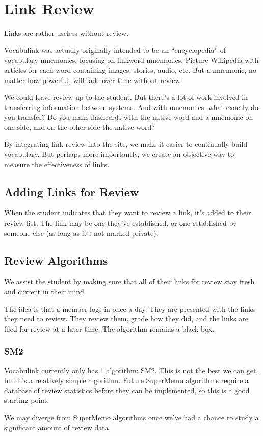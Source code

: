 \chapter{Link Review}

Links are rather useless without review.

Vocabulink was actually originally intended to be an ``encyclopedia'' of
vocabulary mnemonics, focusing on linkword mnemonics. Picture Wikipedia with
articles for each word containing images, stories, audio, etc. But a mnemonic,
no matter how powerful, will fade over time without review.

We could leave review up to the student. But there's a lot of work involved in
transferring information between systems. And with mnemonics, what exactly do
you transfer? Do you make flashcards with the native word and a mnemonic on one
side, and on the other side the native word?

By integrating link review into the site, we make it easier to continually
build vocabulary. But perhaps more importantly, we create an objective way to
measure the effectiveness of links.

\section{Adding Links for Review}

When the student indicates that they want to review a link, it's added to their
review list. The link may be one they've established, or one established by
someone else (as long as it's not marked private).

\section{Review Algorithms}

We assist the student by making sure that all of their links for review stay
fresh and current in their mind.

The idea is that a member logs in once a day. They are presented with the links
they need to review. They review them, grade how they did, and the links are
filed for review at a later time. The algorithm remains a black box.

\subsection{SM2}

Vocabulink currently only has 1 algorithm:
\href{http://www.supermemo.com/english/ol/sm2.htm}{SM2}. This is not the best
we can get, but it's a relatively simple algorithm. Future SuperMemo algorithms
require a database of review statistics before they can be implemented, so this
is a good starting point.

We may diverge from SuperMemo algorithms once we've had a chance to study a
significant amount of review data.
